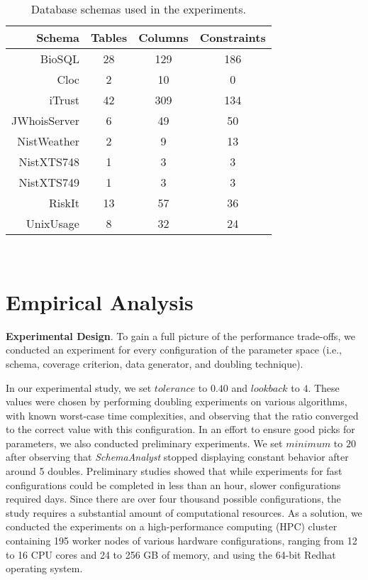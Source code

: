 
\begin{table}[t]
  \centering

  \begin{tabular}{r | c c c}
                           Schema  & Tables & Columns & Constraints \\ \hline
    BioSQL                   & 28     & 129     & 186 \\
    Cloc & 2 & 10 & 0 \\
    iTrust & 42 & 309 & 134 \\
    JWhoisServer & 6 & 49 & 50 \\
    NistWeather & 2 & 9 & 13 \\
    NistXTS748 & 1 & 3 & 3 \\
    NistXTS749 & 1 & 3 & 3 \\
    RiskIt & 13 & 57 & 36 \\
    UnixUsage & 8 & 32 & 24 
  \end{tabular}

  \caption{Database schemas used in the experiments.}~\label{tab:schemas}
\end{table}

\vspace{-.05in}
\section{Empirical Analysis}
\vspace{-.05in}

\textbf{Experimental Design}. To gain a full picture of the performance trade-offs, we conducted an experiment for every
configuration of the parameter space (i.e., schema, coverage criterion, data generator, and doubling technique).

In our experimental study, we set $\mathit{tolerance}$ to $0.40$ and $\mathit{lookback}$ to $4$. These values were
chosen by performing doubling experiments on various algorithms, with known worst-case time complexities, and observing
that the ratio converged to the correct value with this configuration.  In an effort to ensure good picks for
parameters, we also conducted preliminary experiments. We set $\mathit{minimum}$ to $20$ after observing that
\textit{SchemaAnalyst} stopped displaying constant behavior after around 5 doubles.  Preliminary studies showed that
while experiments for fast configurations could be completed in less than an hour, slower configurations required days.
Since there are over four thousand possible configurations, the study requires a substantial amount of computational
resources.  As a solution, we conducted the experiments on a high-performance computing (HPC) cluster containing 195
worker nodes of various hardware configurations, ranging from 12 to 16 CPU cores and 24 to 256 GB of memory, and using
the 64-bit Redhat operating system.



